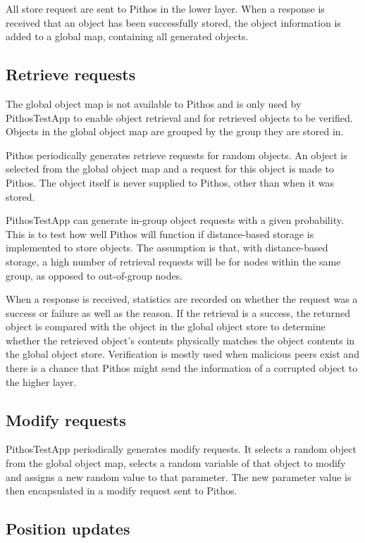 All store request are sent to Pithos in the lower layer. When a response is received that an object has been successfully stored, the object information is added to a global map, containing all generated objects.

\subsection{Retrieve requests}

The global object map is not available to Pithos and is only used by PithosTestApp to enable object retrieval and for retrieved objects to be verified. Objects in the global object map are grouped by the group they are stored in.

Pithos periodically generates retrieve requests for random objects. An object is selected from the global object map and a request for this object is made to Pithos. The object itself is never supplied to Pithos, other than when it was stored.

PithosTestApp can generate in-group object requests with a given probability. This is to test how well Pithos will function if distance-based storage is implemented to store objects. The assumption is that, with distance-based storage, a high number of retrieval requests will be for nodes within the same group, as opposed to out-of-group nodes.

When a response is received, statistics are recorded on whether the request was a success or failure as well as the reason. If the retrieval is a success, the returned object is compared with the object in the global object store to determine whether the retrieved object's contents physically matches the object contents in the global object store. Verification is mostly used when malicious peers exist and there is a chance that Pithos might send the information of a corrupted object to the higher layer.

\subsection{Modify requests}

PithosTestApp periodically generates modify requests. It selects a random object from the global object map, selects a random variable of that object to modify and assigns a new random value to that parameter. The new parameter value is then encapsulated in a modify request sent to Pithos.

\subsection{Position updates}

